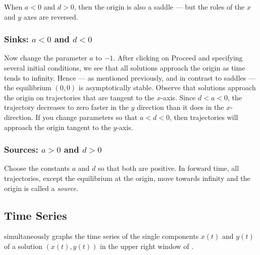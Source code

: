 \documentclass{ximera}
\begin{document}
When $a<0$ and $d>0$, then the origin is also a saddle ---
but the roles of the $x$ and $y$ axes are reversed.

\subsubsection*{Sinks: $a<0$ and $d<0$} 

Now change the parameter $a$ to $-1$. After clicking on {\sf
Proceed} and specifying several initial conditions, we see that
all solutions approach the origin as time tends to infinity.
Hence --- as mentioned previously, and in contrast to saddles ---
the equilibrium $(0,0)$ is asymptotically stable.  Observe that
solutions approach the origin on trajectories that are tangent to
the $x$-axis.  Since $d<a<0$, the trajectory decreases to zero faster
in the $y$ direction than it does in the $x$-direction.  If
you change parameters so that $a<d<0$, then trajectories will
approach the origin tangent to the $y$-axis.

\subsubsection*{Sources: $a>0$ and $d>0$} 

Choose the constants $a$ and $d$ so that both are positive.
In forward time, all trajectories, except the equilibrium at the
origin, move towards infinity and the origin is called a
{\em source\/}.

\subsection*{Time Series} 

{\pplane} simultaneously graphs the time series of the
single components $x(t)$ and $y(t)$ of a solution $(x(t),y(t))$
in the upper right window of \pplane.




\end{document}
